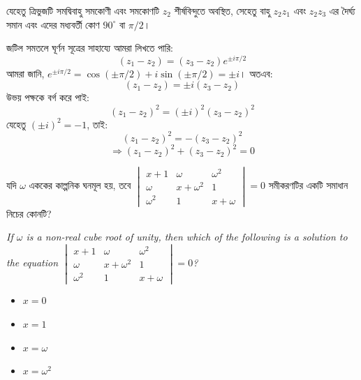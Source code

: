 \documentclass[12pt, a4paper]{article}
\begin{document}
\begin{tcolorbox}[solutionbox={সমাধান (Solution)}]
    \noindent
    যেহেতু ত্রিভুজটি সমদ্বিবাহু সমকোণী এবং সমকোণটি $z_2$ শীর্ষবিন্দুতে অবস্থিত, সেহেতু বাহু $z_2 z_1$ এবং $z_2 z_3$ এর দৈর্ঘ্য সমান এবং এদের মধ্যবর্তী কোণ $90^\circ$ বা $\pi/2$। 
    
    জটিল সমতলে ঘূর্ণন সূত্রের সাহায্যে আমরা লিখতে পারি:
    \[ (z_1 - z_2) = (z_3 - z_2) e^{\pm i\pi/2} \]
    আমরা জানি, $e^{\pm i\pi/2} = \cos(\pm\pi/2) + i\sin(\pm\pi/2) = \pm i$। অতএব:
    \[ (z_1 - z_2) = \pm i (z_3 - z_2) \]
    উভয় পক্ষকে বর্গ করে পাই:
    \[ (z_1 - z_2)^2 = (\pm i)^2 (z_3 - z_2)^2 \]
    যেহেতু $(\pm i)^2 = -1$, তাই:
    \[ (z_1 - z_2)^2 = - (z_3 - z_2)^2 \]
    \[ \Rightarrow (z_1 - z_2)^2 + (z_3 - z_2)^2 = 0 \]
\end{tcolorbox}
\begin{tcolorbox}[questionbox={প্রশ্ন (Question) 18}]
    \noindent
    যদি $\omega$ এককের কাল্পনিক ঘনমূল হয়, তবে $\begin{vmatrix} x+1 & \omega & \omega^2 \\ \omega & x+\omega^2 & 1 \\ \omega^2 & 1 & x+\omega \end{vmatrix} = 0$ সমীকরণটির একটি সমাধান নিচের কোনটি?
    
    \vspace{0.8em}
    \begin{english}
    \noindent\textit{\color{darkgray}
    If $\omega$ is a non-real cube root of unity, then which of the following is a solution to the equation $\begin{vmatrix} x+1 & \omega & \omega^2 \\ \omega & x+\omega^2 & 1 \\ \omega^2 & 1 & x+\omega \end{vmatrix} = 0$?
    }
    \end{english}
\end{tcolorbox}

\begin{itemize}[label={}, leftmargin=1cm, itemsep=0.5em]
    \item[\textbf{A)}] $x = 0$
    \item[\textbf{B)}] $x = 1$
    \item[\textbf{C)}] $x = \omega$
    \item[\textbf{D)}] $x = \omega^2$
\end{itemize}
\end{document}

